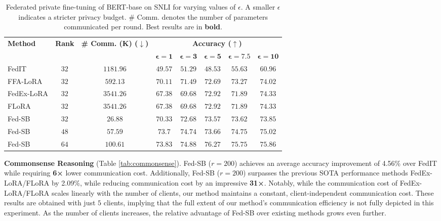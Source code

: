 \begin{table*}[!h]
\centering
\setlength{\tabcolsep}{4.5pt}
\small
\begin{tabular}{lcc|ccccc}
\toprule
\multirow{2}{*}{\bf Method} & \multirow{2}{*}{\bf Rank} & \multirow{2}{*}{\bf \# Comm. (K) ($\downarrow$)} & \multicolumn{5}{c}{\textbf{Accuracy ($\uparrow$)}} \\
  &  &  & $\mathbf{\epsilon=1}$ & $\mathbf{\epsilon=3}$ & $\mathbf{\epsilon=5}$ & $\mathbf{\epsilon=7.5}$ & $\mathbf{\epsilon=10}$ \\
\midrule
FedIT & $32$ & $1181.96$ & $49.57$ & $51.29$ & $48.53$ &  $55.63$ & $60.96$  \\
FFA-LoRA   & $32$ & $592.13$ & $70.11$ & $71.49$ & $72.69$ & $73.27$ & $74.02$  \\
FedEx-LoRA   & $32$ & $3541.26$ & $67.38$& $69.68$ & $72.92$& $71.89$ & $74.33$  \\
FLoRA   & $32$ & $3541.26$ & $67.38$ & $69.68$ & $72.92$& $71.89$ & $74.33$  \\
\rowcolor{cyan!10} 
Fed-SB & $32$ & $26.88$  & $70.33$ & $72.68$ & $73.57$& $73.62$ & $73.85$  \\
\rowcolor{cyan!10} 
Fed-SB & $48$ & $57.59$ & $73.7$ & $74.74$ & $73.66$& $74.75$ & $75.02$ \\
\rowcolor{cyan!10} 
Fed-SB & $64$ & $100.61$ & $\mathbf{73.83}$ & $\mathbf{74.88}$& $\mathbf{76.27}$ & $\mathbf{75.75}$ & $\mathbf{75.86}$\\
\bottomrule
\end{tabular}
\caption{Federated private fine-tuning of BERT-base on SNLI for varying values of $\epsilon$. A smaller $\epsilon$ indicates a stricter privacy budget. \# Comm. denotes the number of parameters communicated per round. Best results are in \textbf{bold}.
}
\label{tab:fed-central}
\end{table*}

\textbf{Commonsense Reasoning} (Table \ref{tab:commonsense}). 
Fed-SB ($r=200$) achieves an average accuracy improvement of 4.56\% over FedIT while requiring \textbf{6×} lower communication cost. 
Additionally, Fed-SB ($r=200$) surpasses the previous SOTA performance methods FedEx-LoRA/FLoRA by 2.09\%, while reducing communication cost by an impressive \textbf{31×}. 
Notably, while the communication cost of FedEx-LoRA/FLoRA scales linearly with the number of clients, our method maintains a constant, client-independent communication cost. 
These results are obtained with just $5$ clients, implying that the full extent of our method’s communication efficiency is not fully depicted in this experiment. 
As the number of clients increases, the relative advantage of Fed-SB over existing methods grows even further.
\\

